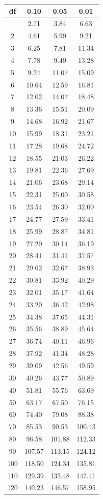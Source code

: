 \documentclass[
]{book}
\theoremstyle{definition}
\theoremstyle{definition}
\theoremstyle{definition}
\theoremstyle{definition}
\theoremstyle{remark}
\begin{document}
\begin{longtable}[]{@{}cccc@{}}
\toprule\noalign{}
df & 0.10 & 0.05 & 0.01 \\
\midrule\noalign{}
\endhead
\bottomrule\noalign{}
\endlastfoot
1 & 2.71 & 3.84 & 6.63 \\
2 & 4.61 & 5.99 & 9.21 \\
3 & 6.25 & 7.81 & 11.34 \\
4 & 7.78 & 9.49 & 13.28 \\
5 & 9.24 & 11.07 & 15.09 \\
6 & 10.64 & 12.59 & 16.81 \\
7 & 12.02 & 14.07 & 18.48 \\
8 & 13.36 & 15.51 & 20.09 \\
9 & 14.68 & 16.92 & 21.67 \\
10 & 15.99 & 18.31 & 23.21 \\
11 & 17.28 & 19.68 & 24.72 \\
12 & 18.55 & 21.03 & 26.22 \\
13 & 19.81 & 22.36 & 27.69 \\
14 & 21.06 & 23.68 & 29.14 \\
15 & 22.31 & 25.00 & 30.58 \\
16 & 23.54 & 26.30 & 32.00 \\
17 & 24.77 & 27.59 & 33.41 \\
18 & 25.99 & 28.87 & 34.81 \\
19 & 27.20 & 30.14 & 36.19 \\
20 & 28.41 & 31.41 & 37.57 \\
21 & 29.62 & 32.67 & 38.93 \\
22 & 30.81 & 33.92 & 40.29 \\
23 & 32.01 & 35.17 & 41.64 \\
24 & 33.20 & 36.42 & 42.98 \\
25 & 34.38 & 37.65 & 44.31 \\
26 & 35.56 & 38.89 & 45.64 \\
27 & 36.74 & 40.11 & 46.96 \\
28 & 37.92 & 41.34 & 48.28 \\
29 & 39.09 & 42.56 & 49.59 \\
30 & 40.26 & 43.77 & 50.89 \\
40 & 51.81 & 55.76 & 63.69 \\
50 & 63.17 & 67.50 & 76.15 \\
60 & 74.40 & 79.08 & 88.38 \\
70 & 85.53 & 90.53 & 100.43 \\
80 & 96.58 & 101.88 & 112.33 \\
90 & 107.57 & 113.15 & 124.12 \\
100 & 118.50 & 124.34 & 135.81 \\
110 & 129.39 & 135.48 & 147.41 \\
120 & 140.23 & 146.57 & 158.95 \\
\end{longtable}
\end{document}

